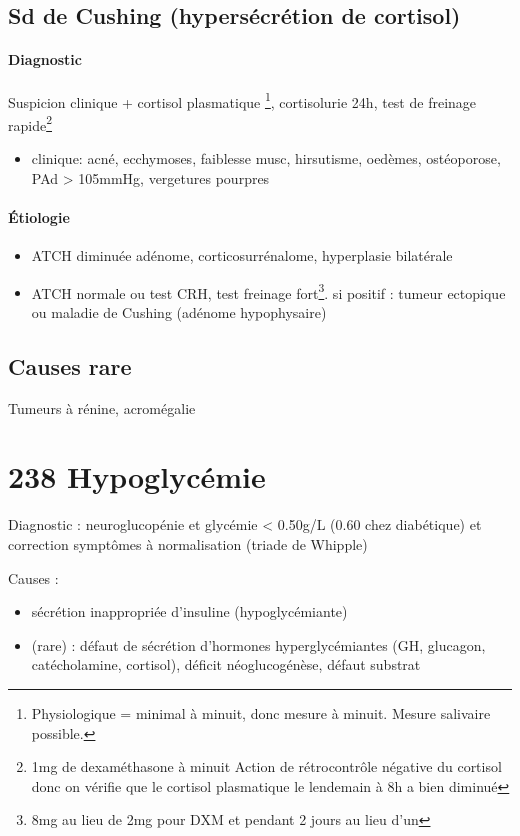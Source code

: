 \documentclass{book}
\begin{document}
\subsection{Sd de Cushing (hypersécrétion de cortisol)}
\label{sec:org0ca416f}

\paragraph{Diagnostic}
\label{sec:org677f0ae}
Suspicion clinique + cortisol plasmatique \footnote{Physiologique = minimal à minuit, donc mesure à minuit. Mesure salivaire possible.}, cortisolurie 24h, test de freinage rapide\footnote{1mg de dexaméthasone à minuit Action de rétrocontrôle négative du
cortisol donc on vérifie que le cortisol plasmatique le lendemain à 8h a bien diminué}
\begin{itemize}
\item clinique: acné, ecchymoses, faiblesse musc, hirsutisme, oedèmes, ostéoporose, PAd
> 105mmHg, vergetures pourpres
\end{itemize}

\paragraph{Étiologie}
\label{sec:orga8a478b}
\begin{itemize}
\item ATCH diminuée \thus adénome, corticosurrénalome, hyperplasie bilatérale
\item ATCH normale ou \inc \thus test CRH, test freinage fort\footnote{8mg au lieu de 2mg pour DXM et pendant 2 jours au lieu d'un}. si positif : tumeur ectopique ou
maladie de Cushing  (adénome hypophysaire)
\end{itemize}

\subsection{Causes rare}
\label{sec:org73f6eff}
Tumeurs à rénine, acromégalie
\section{238 \textdagger{} Hypoglycémie}
\label{sec:orgecc66f5}
Diagnostic : neuroglucopénie et glycémie < 0.50g/L (0.60 chez diabétique) et correction symptômes
à normalisation (triade de Whipple)

Causes :
\begin{itemize}
\item sécrétion inappropriée d'insuline (hypoglycémiante)
\item (rare) : défaut de sécrétion d'hormones hyperglycémiantes (GH, glucagon,
catécholamine, cortisol), déficit néoglucogénèse, défaut substrat
\end{itemize}
\end{document}

